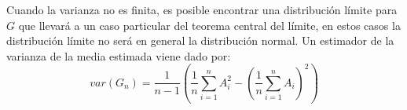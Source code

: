 \documentclass[../proyecto.tex]{memoir}
\begin{document}
Cuando la varianza no es finita, es posible encontrar una distribución límite para $G$ que llevará a un caso particular del teorema central del límite, en estos casos la distribución límite no será en general la distribución normal. Un estimador de la varianza de la media estimada viene dado por:
$$
var(G_n) = \frac{1}{n-1} \left( \frac{1}{n} \sum_{i=1}^n A_i^2 - \left( \frac{1}{n} \sum_{i=1}^n A_i \right)^2 \right)
$$
\end{document}
